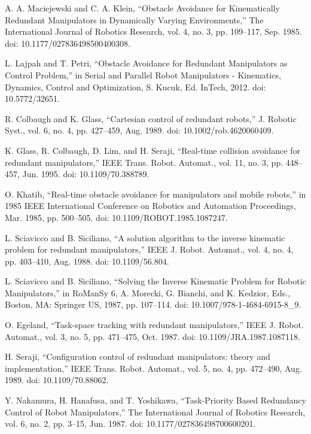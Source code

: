 \documentclass[letterpaper, 10 pt, conference]{ieeeconf}  %
\begin{document}
\begin{thebibliography}{99}
 A. A. Maciejewski and C. A. Klein, “Obstacle Avoidance for Kinematically Redundant Manipulators in Dynamically Varying Environments,” The International Journal of Robotics Research, vol. 4, no. 3, pp. 109–117, Sep. 1985. doi: 10.1177/027836498500400308.

 L. Lajpah and T. Petri, “Obstacle Avoidance for Redundant Manipulators as Control Problem,” in Serial and Parallel Robot Manipulators - Kinematics, Dynamics, Control and Optimization, S. Kucuk, Ed. InTech, 2012. doi: 10.5772/32651.

 R. Colbaugh and K. Glass, “Cartesian control of redundant robots,” J. Robotic Syst., vol. 6, no. 4, pp. 427–459, Aug. 1989. doi: 10.1002/rob.4620060409.

 K. Glass, R. Colbaugh, D. Lim, and H. Seraji, “Real-time collision avoidance for redundant manipulators,” IEEE Trans. Robot. Automat., vol. 11, no. 3, pp. 448–457, Jun. 1995. doi: 10.1109/70.388789.

 O. Khatib, “Real-time obstacle avoidance for manipulators and mobile robots,” in 1985 IEEE International Conference on Robotics and Automation Proceedings, Mar. 1985, pp. 500–505. doi: 10.1109/ROBOT.1985.1087247.

 L. Sciavicco and B. Siciliano, “A solution algorithm to the inverse kinematic problem for redundant manipulators,” IEEE J. Robot. Automat., vol. 4, no. 4, pp. 403–410, Aug. 1988. doi: 10.1109/56.804.

 L. Sciavicco and B. Siciliano, “Solving the Inverse Kinematic Problem for Robotic Manipulators,” in RoManSy 6, A. Morecki, G. Bianchi, and K. Kedzior, Eds., Boston, MA: Springer US, 1987, pp. 107–114. doi: 10.1007/978-1-4684-6915-8\_9.

 O. Egeland, “Task-space tracking with redundant manipulators,” IEEE J. Robot. Automat., vol. 3, no. 5, pp. 471–475, Oct. 1987. doi: 10.1109/JRA.1987.1087118.

 H. Seraji, “Configuration control of redundant manipulators: theory and implementation,” IEEE Trans. Robot. Automat., vol. 5, no. 4, pp. 472–490, Aug. 1989. doi: 10.1109/70.88062.

 Y. Nakamura, H. Hanafusa, and T. Yoshikawa, “Task-Priority Based Redundancy Control of Robot Manipulators,” The International Journal of Robotics Research, vol. 6, no. 2, pp. 3–15, Jun. 1987. doi: 10.1177/027836498700600201.


\end{thebibliography}
\end{document}
